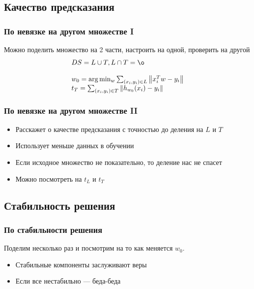 \documentclass[14pt, fleqn, xcolor={dvipsnames, table}]{beamer}
\begin{document}
\subsection{Качество предсказания}

\begin{frame}[t]\frametitle{По невязке на другом множестве I}
Можно поделить множество на 2 части, настроить на одной, проверить на другой
$$
  \begin{array}{ll}
    DS = L \cup T, L \cap T = \o \\
    \\
    w_0 = \arg\min_w \sum_{(x_i,y_i) \in L} \left\| x_i^Tw - y_i \right\| \\
    t_T = \sum_{(x_i,y_i) \in T} \left\| h_{w_0}(x_i) - y_i \right\|
  \end{array}
$$
\end{frame}

\begin{frame}[t]\frametitle{По невязке на другом множестве II}
\begin{itemize}
  \item Расскажет о качестве предсказания с точностью до деления на $L$ и $T$
  \item Использует меньше данных в обучении
  \item Если исходное множество не показательно, то деление нас не спасет
  \item Можно посмотреть на $t_L$ и $t_T$
\end{itemize}
\end{frame}

\subsection{Стабильность решения}

\begin{frame}[t]\frametitle{По стабильности решения}
Поделим несколько раз и посмотрим на то как меняется $w_0$.
\begin{itemize}
  \item Стабильные компоненты заслуживают веры
  \item Если все нестабильно --- беда-беда
\end{itemize}
\end{frame}
\end{document}
